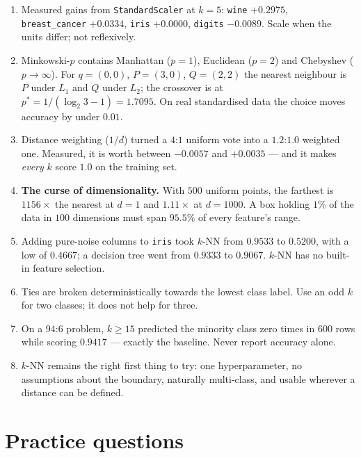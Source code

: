 \documentclass[11pt]{article}
\begin{document}
\begin{enumerate}[leftmargin=*]
    neighbour of $164$ of $171$ test patients and the predicted class of $19$.
  \item Measured gains from \texttt{StandardScaler} at $k=5$: \texttt{wine}
    $+0.2975$, \texttt{breast\_cancer} $+0.0334$, \texttt{iris} $+0.0000$,
    \texttt{digits} $\mathbf{-0.0089}$. Scale when the units differ; not
    reflexively.
  \item Minkowski-$p$ contains Manhattan ($p{=}1$), Euclidean ($p{=}2$) and
    Chebyshev ($p{\to}\infty$). For $q=(0,0)$, $P=(3,0)$, $Q=(2,2)$ the nearest
    neighbour is $P$ under $L_1$ and $Q$ under $L_2$; the crossover is at
    $p^\ast = 1/(\log_2 3 - 1) = 1.7095$. On real standardised data the choice
    moves accuracy by under $0.01$.
  \item Distance weighting ($1/d$) turned a $4$:$1$ uniform vote into a
    $1.2$:$1.0$ weighted one. Measured, it is worth between $-0.0057$ and
    $+0.0035$ --- and it makes \emph{every} $k$ score $1.0$ on the training set.
  \item \textbf{The curse of dimensionality.} With $500$ uniform points, the
    farthest is $1156\times$ the nearest at $d=1$ and $1.11\times$ at
    $d=1000$. A box holding $1\%$ of the data in $100$ dimensions must span
    $95.5\%$ of every feature's range.
  \item Adding pure-noise columns to \texttt{iris} took $k$-NN from $0.9533$
    to $0.5200$, with a low of $0.4667$; a decision tree went from $0.9333$ to
    $0.9067$. $k$-NN has no built-in feature selection.
  \item Ties are broken deterministically towards the lowest class label. Use
    an odd $k$ for two classes; it does not help for three.
  \item On a $94$:$6$ problem, $k \ge 15$ predicted the minority class zero
    times in $600$ rows while scoring $0.9417$ --- exactly the baseline. Never
    report accuracy alone.
  \item $k$-NN remains the right first thing to try: one hyperparameter, no
    assumptions about the boundary, naturally multi-class, and usable wherever
    a distance can be defined.
\end{enumerate}

\section{Practice questions}
\label{sec:practice}
\end{document}
